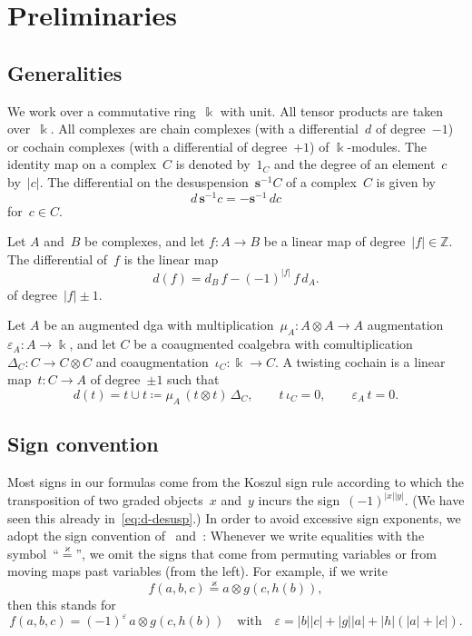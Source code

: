 \documentclass[letterpaper]{amsart}
\numberwithin{equation}{section}
\theoremstyle{plain}
\theoremstyle{definition}
\theoremstyle{remark}
\let\epsilon\varepsilon
\def\Z{\mathbb Z}
\def\kk{\Bbbk}
\def\deg#1{|#1|}
\def\susp{\mathbf{s}}
\def\desusp{\susp^{-1}}
\let\KS\varkappa
\def\eqKS{\stackrel{\KS}{=}}
\begin{document}
\section{Preliminaries}
\label{sec:prelim}


\subsection{Generalities}

We work over a commutative ring~$\kk$ with unit. All tensor products are taken over~$\kk$.
All complexes are chain complexes (with a differential~$d$ of degree~$-1$)
or cochain complexes (with a differential of degree~$+1$) of $\kk$-modules.
The identity map on a complex~$C$ is denoted by~$1_{C}$ and the degree of an element~$c$ by~$\deg{c}$.
The differential on the desuspension~$\desusp C$ of a complex~$C$ is given by
\begin{equation}
  \label{eq:d-desusp}
  d\,\desusp c=-\desusp\,dc
\end{equation}
for~$c\in C$.

Let $A$ and~$B$ be complexes, and let $f\colon A\to B$ be a linear map of degree~$\deg{f}\in\Z$.
The differential of~$f$ is the linear map
\begin{equation}
  \label{eq:diff-map}
  d(f) = d_{B}\,f - (-1)^{\deg{f}}\,f\,d_{A}.
\end{equation}
of degree~$\deg{f}\pm 1$.

Let $A$ be an augmented dga with multiplication~$\mu_{A}\colon A\otimes A\to A$ augmentation~$\epsilon_{A}\colon A\to\kk$,
and let $C$ be a coaugmented coalgebra with comultiplication~$\Delta_{C}\colon C\to C\otimes C$ and coaugmentation~$\iota_{C}\colon\kk\to C$.
A twisting cochain is a linear map~$t\colon C\to A$ of degree~$\pm 1$ such that
\begin{equation}
  d(t) = t\cup t\coloneqq \mu_{A}\,(t\otimes t)\,\Delta_{C},
  \qquad
  t\,\iota_{C} = 0,
  \qquad
  \epsilon_{A}\,t = 0.
\end{equation}


\subsection{Sign convention}

Most signs in our formulas come from the Koszul sign rule according to which the transposition of two graded objects~$x$ and~$y$
incurs the sign~$(-1)^{\deg{x}\deg{y}}$. (We have seen this already in~\eqref{eq:d-desusp}.)
In order to avoid excessive sign exponents, we adopt the sign convention of~\cite{Franz:hgashc} and~\cite{Franz:homog}:
Whenever we write equalities with the symbol~``$\eqKS$'', we omit the signs that come from permuting variables
or from moving maps past variables (from the left). For example, if we write
\begin{equation}
  f(a,b,c) \eqKS a \otimes g(c, h(b)),
\end{equation}
then this stands for
\begin{equation}
  f(a,b,c) = (-1)^{\epsilon}\, a \otimes g(c, h(b))
  \quad\text{with}\quad
  \epsilon = \deg{b} \deg{c} + \deg{g} \deg{a} + \deg{h}(\deg{a}+\deg{c}).
\end{equation}
\end{document}
